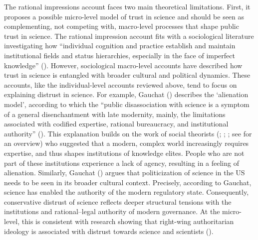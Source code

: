 \documentclass[
  jou,
  floatsintext,
  longtable,
  nolmodern,
  notxfonts,
  notimes,
  colorlinks=true,linkcolor=blue,citecolor=blue,urlcolor=blue]{apa7}
\begin{document}
The rational impressions account faces two main theoretical limitations.
First, it proposes a possible micro-level model of trust in science and
should be seen as complementing, not competing with, macro-level
processes that shape public trust in science. The rational impression
account fits with a sociological literature investigating how
``individual cognition and practice establish and maintain institutional
fields and status hierarchies, especially in the face of imperfect
knowledge''
(). However, sociological macro-level accounts have
described how trust in science is entangled with broader cultural and
political dynamics. These accounts, like the individual-level accounts
reviewed above, tend to focus on explaining distrust in science. For
example, Gauchat
() describes the
`alienation model', according to which the ``public disassociation with
science is a symptom of a general disenchantment with late modernity,
mainly, the limitations associated with codified expertise, rational
bureaucracy, and institutional authority''
(). This explanation builds on the work of social theorists
(;
;
; see
 for an
overview) who suggested that a modern, complex world increasingly
requires expertise, and thus shapes institutions of knowledge elites.
People who are not part of these institutions experience a lack of
agency, resulting in a feeling of alienation. Similarly, Gauchat
() argues that
politicization of science in the US needs to be seen in its broader
cultural context. Precisely, according to Gauchat, science has enabled
the authority of the modern regulatory state. Consequently, conservative
distrust of science reflects deeper structural tensions with the
institutions and rational--legal authority of modern governance. At the
micro-level, this is consistent with research showing that right-wing
authoritarian ideology is associated with distrust towards science and
scientists ().
\end{document}
